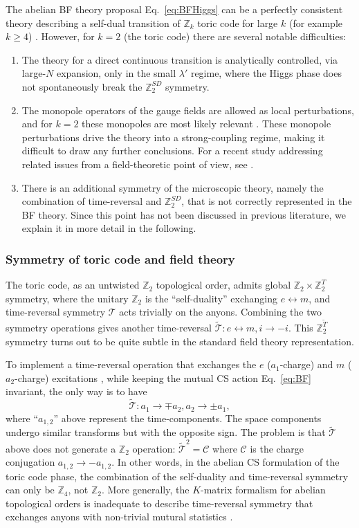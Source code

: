 \documentclass[aps, prl, superscriptaddress, twocolumn,
notitlepage, longbibliography,
floatfix]{revtex4-2}
\newcommand{\1}{\text{\uppercase\expandafter{\romannumeral1}}}
\newcommand{\2}{\text{\uppercase\expandafter{\romannumeral2}}}
\newcommand{\3}{\text{\uppercase\expandafter{\romannumeral3}}}
\newcommand{\4}{\text{\uppercase\expandafter{\romannumeral4}}}
\newcommand{\5}{\text{\uppercase\expandafter{\romannumeral5}}}
\newcommand{\6}{\text{\uppercase\expandafter{\romannumeral6}}}
\def\Z{\mathbb{Z}}
\begin{document}
The abelian BF theory proposal Eq.~\eqref{eq:BFHiggs} can be a perfectly consistent theory describing a self-dual transition of $\Z_k$ toric code for large $k$ (for example $k\geq 4$) \cite{ShiChatterjee2024}. However, for $k=2$ (the toric code) there are several notable difficulties:
\begin{enumerate}
    \item The theory for a direct continuous transition is analytically controlled, via large-$N$ expansion, only in the small $\lambda'$ regime, where the Higgs phase does not spontaneously break the $\Z_2^{SD}$ symmetry.
    \item The monopole operators of the gauge fields are allowed as local perturbations, and for $k=2$ these monopoles are most likely relevant \cite{ShiChatterjee2024}. These monopole perturbations drive the theory into a strong-coupling regime, making it difficult to draw any further conclusions. For a recent study addressing related issues from a field-theoretic point of view, see \cite{Dumitrescu:2024jko}.
    \item There is an additional symmetry of the microscopic theory, namely the combination of time-reversal and $\Z_2^{SD}$, that is not correctly represented in the BF theory. Since this point has not been discussed in previous literature, we explain it in more detail in the following.
\end{enumerate}


\subsubsection{Symmetry of toric code and field theory}

The toric code, as an untwisted $\Z_2$ topological order, admits global $\Z_2\times\Z_2^T$ symmetry, where the unitary $\Z_2$ is the ``self-duality'' exchanging $e\leftrightarrow m$, and time-reversal symmetry $\mathcal{T}$ acts trivially on the anyons. Combining the two symmetry operations gives another time-reversal $\tilde{\mathcal{T}}: e\leftrightarrow m, i\to-i$. This $\Z_2^{\tilde{T}}$ symmetry turns out to be quite subtle in the standard field theory representation.


To implement a time-reversal operation that exchanges the $e$ ($a_1$-charge) and $m$ ($a_2$-charge) excitations , while keeping the mutual CS action Eq.~\eqref{eq:BF} invariant, the only way is to have
\begin{equation}
    \tilde{\mathcal{T}}: a_1\to \mp a_2, a_2\to \pm a_1,
    \label{eq:TKmatrix}
\end{equation}
where ``$a_{1,2}$'' above represent the time-components. The space components undergo similar transforms but with the opposite sign. The problem is that $\tilde{\mathcal{T}}$ above does not generate a $\Z_2$ operation: $\tilde{\mathcal{T}}^2=\mathcal{C}$ where $\mathcal{C}$ is the charge conjugation $a_{1,2}\to -a_{1,2}$. In other words, in the abelian CS formulation of the toric code phase, the combination of the self-duality and time-reversal symmetry can only be $\Z_4$, not $\Z_2$. {More generally, the $K$-matrix formalism for abelian topological orders is inadequate to describe time-reversal symmetry that exchanges anyons with non-trivial mutural statistics \cite{PhysRevX.3.041016}}.
\end{document}
